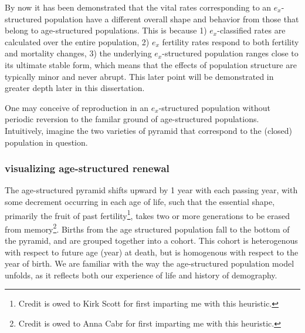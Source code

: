 
By now it has been demonstrated that the vital rates corresponding to an
$e_x$-structured population have a different overall shape and behavior from
those that belong to age-structured populations. This is because 1) $e_x$-classified rates
are calculated over the entire population, 2) $e_x$ fertility rates respond to
both fertility and mortality changes, 3) the underlying $e_x$-structured
population ranges close to its ultimate stable form, which means that
the effects of population structure are typically minor and never abrupt. This
later point will be demonstrated in greater depth later in this dissertation.

One may conceive of reproduction in an $e_x$-structured population without
periodic reversion to the familar ground of age-structured populations.
Intuitively, imagine the two varieties of pyramid that correspond to the
(closed) population in question. 

\subsubsection{visualizing age-structured renewal}
The age-structured pyramid shifts upward by 1 year with
each passing year, with some decrement occurring in each age of life, such that
the essential shape, primarily the fruit of past fertility\footnote{Credit is
owed to Kirk Scott for first imparting me with this heuristic.}, takes two or
more generations to be erased from memory\footnote{Credit is
owed to Anna Cabr for first imparting me with this heuristic.}. Births from the
age structured population fall to the bottom of the pyramid, and are grouped 
together into a cohort. This cohort is heterogenous with respect to future 
age (year) at death, but is
homogenous with respect to the year of birth. We are familiar with
the way the age-structured population model unfolds, as it
reflects both our experience of life and history of demography.

